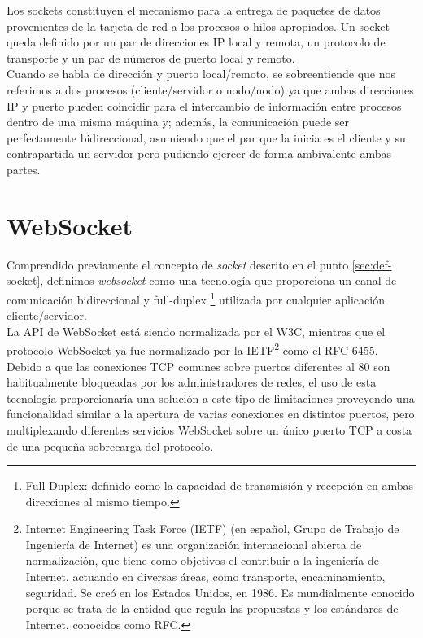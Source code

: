 Los sockets constituyen el mecanismo para la entrega de paquetes de datos provenientes de la tarjeta de red a los procesos o hilos apropiados. Un socket queda definido por un par de direcciones IP local
y remota, un protocolo de transporte y un par de números de puerto local y remoto.\\

Cuando se habla de dirección y puerto local/remoto, se sobreentiende que nos referimos a dos procesos (cliente/servidor o nodo/nodo) ya que ambas direcciones IP y puerto pueden coincidir para el intercambio de información entre procesos dentro de una misma máquina
y; además, la comunicación puede ser perfectamente bidireccional, asumiendo que el par que la inicia es el cliente y su contrapartida un servidor pero pudiendo ejercer de forma ambivalente ambas partes.\\


\section{WebSocket}
\label{sec:def-websocket}

Comprendido previamente el concepto de \emph{socket} descrito en el punto \ref{sec:def-socket}, definimos  \emph{websocket} como una tecnología que proporciona un canal de comunicación bidireccional y full-duplex 
\footnote{Full Duplex: definido como la capacidad de transmisión y recepción en ambas direcciones al mismo tiempo. } utilizada por cualquier aplicación cliente/servidor.\\


La API de WebSocket está siendo normalizada por el W3C, mientras que el protocolo WebSocket ya fue normalizado por la IETF\footnote{Internet Engineering Task Force (IETF) (en español, Grupo de Trabajo de Ingeniería de Internet)
es una organización internacional abierta de normalización, que tiene como objetivos el contribuir a la ingeniería de Internet, actuando en diversas áreas, como transporte, encaminamiento, seguridad.
Se creó en los Estados Unidos, en 1986. Es mundialmente conocido porque se trata de la entidad que regula las propuestas y los estándares de Internet, conocidos como RFC.} como el RFC 6455.\\

Debido a que las conexiones TCP comunes sobre puertos diferentes al 80 son habitualmente bloqueadas por los administradores de redes, el uso de esta tecnología proporcionaría una solución
a este tipo de limitaciones proveyendo una funcionalidad similar a la apertura de varias conexiones en distintos puertos, pero multiplexando diferentes servicios WebSocket sobre un único
puerto TCP a costa de una pequeña sobrecarga del protocolo.


